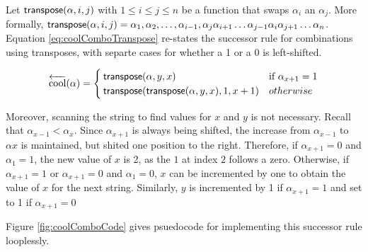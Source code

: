  Let $\mathsf{transpose(} \alpha, i, j \mathsf{)}$ with $1 \le i \le j \le n$ be a function that swaps $\alpha_i$ an $\alpha_j$.  More formally, $\mathsf{transpose(} \alpha, i, j \mathsf{)}=\alpha_1,\alpha_2,\dots,\alpha_{i-1},\alpha_{j}\alpha_{i+1}\dots \alpha_{j-1}\alpha_i \alpha_{j+1}\dots \alpha_n$.  Equation \ref{eq:coolComboTranspose} re-states the successor rule for combinations using transposes, with separte cases for whether a 1 or a 0 is left-shifted.

\begin{equation}\label{eq:coolComboTranspose}
    \overleftarrow{\text{cool}}(\alpha) = \begin{cases}
	\mathsf{transpose(} \alpha, y, x \mathsf{)} & \text{if $\alpha_{x+1}=1$}\\
	\mathsf{transpose(} \mathsf{transpose(} \alpha, y, x \mathsf{)}, 1, x+1 \mathsf{)} & otherwise\\
\end{cases}
\end{equation}

Moreover, scanning the string to find values for $x$ and $y$ is not necessary.  Recall that $\alpha_{x-1} < \alpha_{x}$.  Since $\alpha_{x+1}$ is always being shifted, the increase from $\alpha_{x-1}$ to $\alpha{x}$ is maintained, but shited one position to the right.  Therefore, if $\alpha_{x+1}=0$ and $\alpha_{1}=1$, the new value of $x$ is 2, as the $1$ at index $2$ follows a zero.  Otherwise, if $\alpha_{x+1}=1$ or $\alpha_{x+1}=0$ and $\alpha_{1}=0$, $x$ can be incremented by one to obtain the value of $x$ for the next string.  Similarly, $y$ is incremented by 1 if $\alpha_{x+1}=1$ and set to 1 if $\alpha_{x+1}=0$

Figure \ref{fig:coolComboCode} gives psuedocode for implementing this successor rule looplessly.

